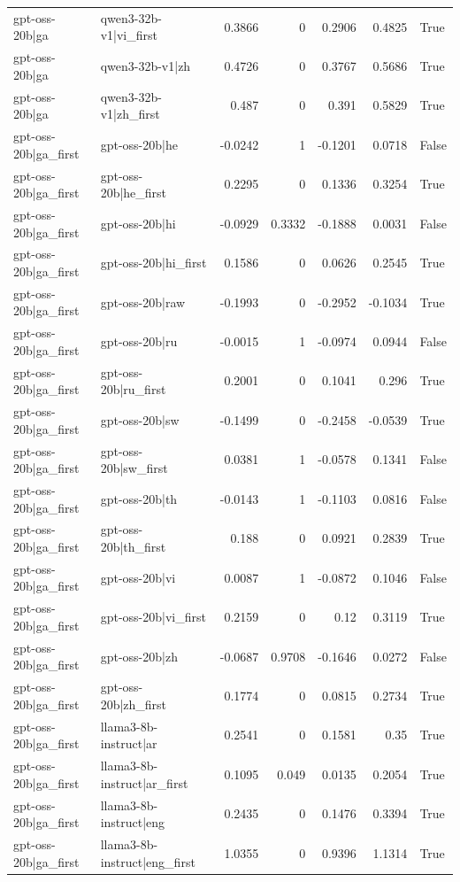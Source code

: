 \begin{table}
\begin{tabular}{l l r r r r l}
gpt-oss-20b|ga & qwen3-32b-v1|vi_first & 0.3866 & 0 & 0.2906 & 0.4825 & True \\
gpt-oss-20b|ga & qwen3-32b-v1|zh & 0.4726 & 0 & 0.3767 & 0.5686 & True \\
gpt-oss-20b|ga & qwen3-32b-v1|zh_first & 0.487 & 0 & 0.391 & 0.5829 & True \\
gpt-oss-20b|ga_first & gpt-oss-20b|he & -0.0242 & 1 & -0.1201 & 0.0718 & False \\
gpt-oss-20b|ga_first & gpt-oss-20b|he_first & 0.2295 & 0 & 0.1336 & 0.3254 & True \\
gpt-oss-20b|ga_first & gpt-oss-20b|hi & -0.0929 & 0.3332 & -0.1888 & 0.0031 & False \\
gpt-oss-20b|ga_first & gpt-oss-20b|hi_first & 0.1586 & 0 & 0.0626 & 0.2545 & True \\
gpt-oss-20b|ga_first & gpt-oss-20b|raw & -0.1993 & 0 & -0.2952 & -0.1034 & True \\
gpt-oss-20b|ga_first & gpt-oss-20b|ru & -0.0015 & 1 & -0.0974 & 0.0944 & False \\
gpt-oss-20b|ga_first & gpt-oss-20b|ru_first & 0.2001 & 0 & 0.1041 & 0.296 & True \\
gpt-oss-20b|ga_first & gpt-oss-20b|sw & -0.1499 & 0 & -0.2458 & -0.0539 & True \\
gpt-oss-20b|ga_first & gpt-oss-20b|sw_first & 0.0381 & 1 & -0.0578 & 0.1341 & False \\
gpt-oss-20b|ga_first & gpt-oss-20b|th & -0.0143 & 1 & -0.1103 & 0.0816 & False \\
gpt-oss-20b|ga_first & gpt-oss-20b|th_first & 0.188 & 0 & 0.0921 & 0.2839 & True \\
gpt-oss-20b|ga_first & gpt-oss-20b|vi & 0.0087 & 1 & -0.0872 & 0.1046 & False \\
gpt-oss-20b|ga_first & gpt-oss-20b|vi_first & 0.2159 & 0 & 0.12 & 0.3119 & True \\
gpt-oss-20b|ga_first & gpt-oss-20b|zh & -0.0687 & 0.9708 & -0.1646 & 0.0272 & False \\
gpt-oss-20b|ga_first & gpt-oss-20b|zh_first & 0.1774 & 0 & 0.0815 & 0.2734 & True \\
gpt-oss-20b|ga_first & llama3-8b-instruct|ar & 0.2541 & 0 & 0.1581 & 0.35 & True \\
gpt-oss-20b|ga_first & llama3-8b-instruct|ar_first & 0.1095 & 0.049 & 0.0135 & 0.2054 & True \\
gpt-oss-20b|ga_first & llama3-8b-instruct|eng & 0.2435 & 0 & 0.1476 & 0.3394 & True \\
gpt-oss-20b|ga_first & llama3-8b-instruct|eng_first & 1.0355 & 0 & 0.9396 & 1.1314 & True \\

\end{tabular}
\end{table}
